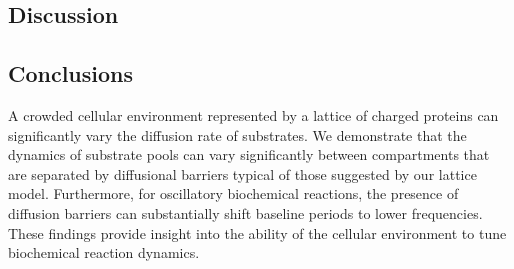 \subsection{Discussion} 


\subsection{Conclusions} 
A crowded cellular environment represented by a lattice of charged proteins can significantly vary the diffusion rate of substrates. 
We demonstrate that the dynamics of substrate pools can vary significantly between compartments that are separated by diffusional barriers typical of those suggested by our lattice model.
Furthermore, for oscillatory biochemical reactions, the presence of diffusion barriers can substantially shift baseline periods to lower frequencies. 
These findings provide insight into the ability of the cellular environment to tune biochemical reaction dynamics. 

%
%
%	
	
